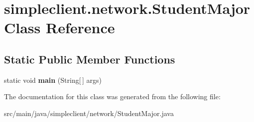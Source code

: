 \hypertarget{classsimpleclient_1_1network_1_1StudentMajor}{}\section{simpleclient.\+network.\+Student\+Major Class Reference}
\label{classsimpleclient_1_1network_1_1StudentMajor}
\subsection*{Static Public Member Functions}
\begin{DoxyCompactItemize}
\item 
\mbox{\label{classsimpleclient_1_1network_1_1StudentMajor_aef74abf87ff1920bd4ced3d0b6918cda}} 
static void {\bfseries main} (String\mbox{[}$\,$\mbox{]} args)
\end{DoxyCompactItemize}


The documentation for this class was generated from the following file\+:\begin{DoxyCompactItemize}
\item 
src/main/java/simpleclient/network/Student\+Major.\+java\end{DoxyCompactItemize}

